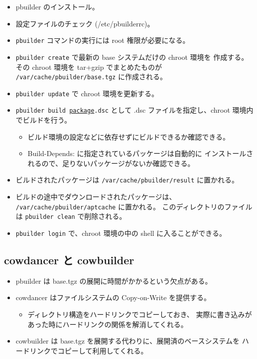 \documentclass[mingoth,a4paper]{jsarticle}
\begin{document}
\begin{itemize}
\item pbuilder のインストール。
\item 設定ファイルのチェック (/etc/pbuilderrc)。
\item \texttt{pbuilder} コマンドの実行には root 権限が必要になる。
\item \texttt{pbuilder create} で最新の base システムだけの chroot 環境を
  作成する。
  その chroot 環境を tar+gzip でまとめたものが
  \texttt{/var/cache/pbuilder/base.tgz} に作成される。
\item \texttt{pbuilder update} で chroot 環境を更新する。
\item \texttt{pbuilder build \underline{package}.dsc} として
  .dsc ファイルを指定し、chroot 環境内でビルドを行う。
  \begin{itemize}
  \item ビルド環境の設定などに依存せずにビルドできるか確認できる。
  \item Build-Depends: に指定されているパッケージは自動的に
    インストールされるので、足りないパッケージがないか確認できる。
  \end{itemize}
\item ビルドされたパッケージは \texttt{/var/cache/pbuilder/result} に置かれる。
\item ビルドの途中でダウンロードされたパッケージは、
  \texttt{/var/cache/pbuilder/aptcache} に置かれる。
  このディレクトリのファイルは \texttt{pbuilder clean} で削除される。
\item \texttt{pbuilder login} で、chroot 環境の中の shell に入ることができる。
\end{itemize}


\subsection{cowdancer と cowbuilder}

\begin{itemize}
\item pbuilder は base.tgz の展開に時間がかかるという欠点がある。
\item cowdancer はファイルシステムの Copy-on-Write を提供する。
  \begin{itemize}
  \item ディレクトリ構造をハードリンクでコピーしておき、
    実際に書き込みがあった時にハードリンクの関係を解消してくれる。
  \end{itemize}
\item cowbuilder は base.tgz を展開する代わりに、展開済のベースシステムを
  ハードリンクでコピーして利用してくれる。
\end{itemize}
\end{document}
